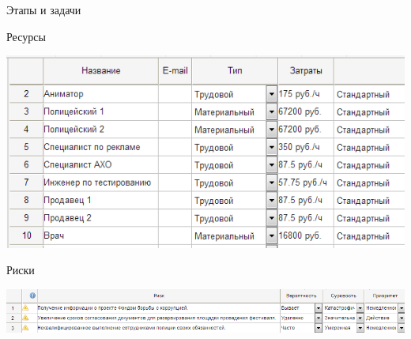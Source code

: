 \documentclass[10pt,pdf,hyperref=unicode,hyperref={bookmarks=false}]{beamer}
\begin{document}
\begin{frame}[allowframebreaks]{Этапы и задачи}
\begin{center}
      \end{center}
    \end{frame}
    \begin{frame}{Ресурсы}
      \begin{center}
        \includegraphics[keepaspectratio=true,width=\textwidth,height=0.8\textheight]{rs.png}\\
      \end{center}
    \end{frame}
    \begin{frame}{Риски}
      \begin{center}
        \includegraphics[keepaspectratio=true,width=\textwidth,height=0.8\textheight]{risks.png}\\
      \end{center}
    \end{frame}
\end{document}
